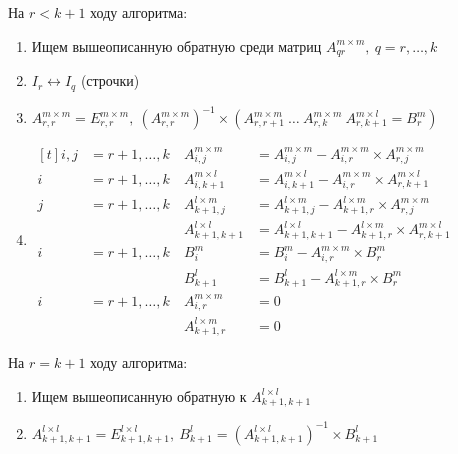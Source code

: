 \documentclass[12pt]{article}
\begin{document}
            На $r < k + 1$ ходу алгоритма: 
        \begin{enumerate}
            \item Ищем вышеописанную обратную среди матриц $A_{qr}^{m \times m},\ q = r, \ldots, k$ 
            \item $I_{r} \leftrightarrow I_{q}$ (строчки)
            \item $A_{r,r}^{m \times m} = E_{r,r}^{m \times m}, \ (A_{r,r}^{{m \times m}})^{-1} \times (A_{r,r+1}^{m \times m} \ \ldots \ A_{r,k}^{m \times m} \ A_{r,k+1}^{m \times l}
            = B_{r}^{m})$
            \item 
            $\begin{aligned}[t]
                i, j &= r+1, \ldots, k &\ A_{i, j}^{m \times m}   &= A_{i, j}^{m \times m} - A_{i,r}^{m \times m} \times A_{r,j}^{m \times m}        \\
                i   &= r+1, \ldots, k &\ A_{i,k+1}^{m \times l}   &= A_{i,k+1}^{m \times l} - A_{i,r}^{m \times m} \times A_{r,k+1}^{m \times l}     \\
                j   &= r+1, \ldots, k &\ A_{k+1,j}^{l \times m}   &= A_{k+1,j}^{l \times m} - A_{k+1,r}^{l \times m} \times A_{r,j}^{m \times m}     \\
                    &                 &\ A_{k+1,k+1}^{l \times l} &= A_{k+1,k+1}^{l \times l} - A_{k+1,r}^{l \times m} \times A_{r,k+1}^{m \times l} \\
                i   &= r+1, \ldots, k &\ B_{i}^{m}                &= B_{i}^{m} - A_{i,r}^{m \times m} \times B_{r}^{m} \\
                    &                 &\ B_{k+1}^{l}              &= B_{k+1}^{l} - A_{k+1,r}^{l \times m} \times B_{r}^{m}\\                
                i   &= r+1, \ldots, k &\ A_{i,r}^{m \times m}     &= 0 \\
                    &                 &\ A_{k+1,r}^{l \times m}   &= 0 
            \end{aligned}$
        \end{enumerate}

            На $r = k + 1$ ходу алгоритма:
            \begin{enumerate}
                \item \addtocounter{enumi}{1} Ищем вышеописанную обратную к $A_{k+1,k+1}^{l \times l}$
                \item $A_{k+1,k+1}^{l \times l} = E_{k+1,k+1}^{l \times l}, \ B_{k+1}^{l} = (A_{k+1,k+1}^{l \times l})^{-1} \times B_{k+1}^{l} $
            \end{enumerate}
\end{document}

